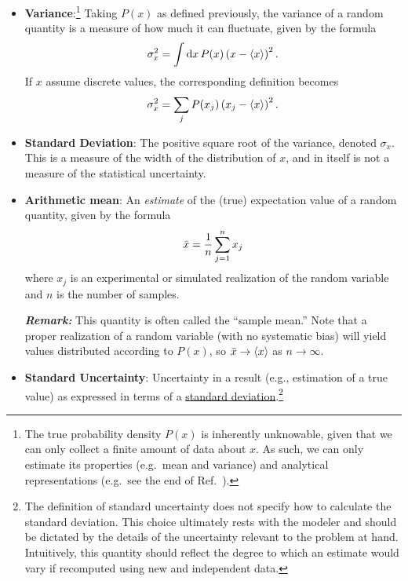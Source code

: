 \begin{itemize}
\item {\bf Variance}:\footnote{The true probability density $P(x)$ is inherently unknowable, given that we can only collect a finite amount of data about $x$.  As such, we can only estimate its properties (e.g.\ mean and variance) and analytical representations (e.g.\ see the end of Ref.\ \cite{SMC}).} Taking $P(x)$ as defined previously, the variance of a random quantity is a measure of how much it can fluctuate, given by the formula
\begin{align}
\sigma_x^2 = \int {\rm d}x\, P(x) \left( x  - \langle x \rangle \right)^2.
\end{align}
If $x$ assume discrete values, the corresponding definition becomes
\begin{align}
\sigma_x^2 = \sum_j P(x_j) \left( x_j  - \langle x \rangle \right)^2.
\end{align}

\item {\bf Standard Deviation}: The positive square root of the variance, denoted $\sigma_x$.\label{def:st_dev}  This is a measure of the width of the distribution of $x$, and in itself is not a measure of the statistical uncertainty.

\item {\bf Arithmetic mean}: An \emph{estimate} of the (true) expectation value of a random quantity, given by the formula
  \begin{equation}
    \bar{x} = \dfrac{1}{n} \sum_{j=1}^{n} x_j \label{def:arith_mean}
  \end{equation}
  where $x_j$ is an experimental or simulated realization of the random variable and $n$ is the number of samples.
\smallskip

\textbf{\textit{Remark:}} This quantity is often called the ``sample mean.''
Note that a proper realization of a random variable (with no systematic bias) will yield values distributed according to $P(x)$, so $\bar{x} \rightarrow \langle x \rangle$ as $n \rightarrow \infty$.


\item {\bf Standard Uncertainty}: Uncertainty in a result (e.g., estimation of a true value) as expressed in terms of a \hyperref[def:st_dev]{standard deviation}.\footnote{The definition of standard uncertainty does not specify how to calculate the standard deviation. This choice ultimately rests with the modeler and should be dictated by the details of the uncertainty relevant to the problem at hand.  Intuitively, this quantity should reflect the degree to which an estimate would vary if recomputed using new and independent data.}
  \label{def:std_unc}


\end{itemize}
